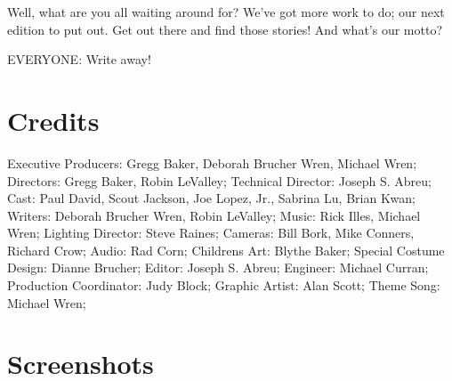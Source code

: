 Well, what are you all waiting around for?
We've got more work to do; our next edition to put out.
Get out there and find those stories!
And what's our motto?

EVERYONE:
Write away!

\section{Credits}

Executive Producers: Gregg Baker, Deborah Brucher Wren, Michael Wren;
Directors: Gregg Baker, Robin LeValley;
Technical Director: Joseph S. Abreu;
Cast: Paul David, Scout Jackson, Joe Lopez, Jr., Sabrina Lu, Brian Kwan;
Writers: Deborah Brucher Wren, Robin LeValley;
Music: Rick Illes, Michael Wren;
Lighting Director: Steve Raines;
Cameras: Bill Bork, Mike Conners, Richard Crow;
Audio: Rad Corn;
Childrens Art: Blythe Baker;
Special Costume Design: Dianne Brucher;
Editor: Joseph S. Abreu;
Engineer: Michael Curran;
Production Coordinator: Judy Block;
Graphic Artist: Alan Scott;
Theme Song: Michael Wren;

\clearpage
\newpage

\section{Screenshots}

